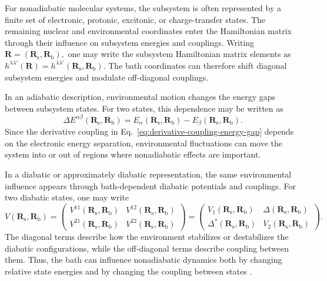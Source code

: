 \documentclass[
  11pt,
  letterpaper,
  onehalfspacing,
  normalmargins,
  equalmargins,
  oneside
]{ut-thesis}
\begin{document}
For nonadiabatic molecular systems, the subsystem is often represented by a
finite set of electronic, protonic, excitonic, or charge-transfer states. The
remaining nuclear and environmental coordinates enter the Hamiltonian matrix
through their influence on subsystem energies and couplings. Writing
$
\mathbf R
=
(\mathbf R_{\mathrm s},\mathbf R_{\mathrm b}),
$
one may write the subsystem Hamiltonian matrix elements as
$
h^{\lambda\lambda'}(\mathbf R)
=
h^{\lambda\lambda'}(\mathbf R_{\mathrm s},\mathbf R_{\mathrm b}) .
$
The bath coordinates can therefore shift diagonal subsystem energies and
modulate off-diagonal couplings.

In an adiabatic description, environmental motion changes the energy gaps
between subsystem states. For two states, this dependence may be written as
\begin{equation}
\Delta E^{\alpha\beta}
(\mathbf R_{\mathrm s},\mathbf R_{\mathrm b})
=
E_\alpha(\mathbf R_{\mathrm s},\mathbf R_{\mathrm b})
-
E_\beta(\mathbf R_{\mathrm s},\mathbf R_{\mathrm b}) .
\label{eq:bath-dependent-adiabatic-energy-gap}
\end{equation}
Since the derivative coupling in
Eq.~\eqref{eq:derivative-coupling-energy-gap} depends on the electronic energy
separation, environmental fluctuations can move the system into or out of
regions where nonadiabatic effects are important.

In a diabatic or approximately diabatic representation, the same environmental
influence appears through bath-dependent diabatic potentials and couplings. For
two diabatic states, one may write
\begin{equation}
V(\mathbf R_{\mathrm s},\mathbf R_{\mathrm b})
=
\begin{pmatrix}
V^{11}(\mathbf R_{\mathrm s},\mathbf R_{\mathrm b})
&
V^{12}(\mathbf R_{\mathrm s},\mathbf R_{\mathrm b})
\\
V^{21}(\mathbf R_{\mathrm s},\mathbf R_{\mathrm b})
&
V^{22}(\mathbf R_{\mathrm s},\mathbf R_{\mathrm b})
\end{pmatrix}
=
\begin{pmatrix}
V_1(\mathbf R_{\mathrm s},\mathbf R_{\mathrm b})
&
\Delta(\mathbf R_{\mathrm s},\mathbf R_{\mathrm b})
\\
\Delta^\ast(\mathbf R_{\mathrm s},\mathbf R_{\mathrm b})
&
V_2(\mathbf R_{\mathrm s},\mathbf R_{\mathrm b})
\end{pmatrix}.
\label{eq:bath-dependent-diabatic-potential-matrix}
\end{equation}
The diagonal terms describe how the environment stabilizes or destabilizes the
diabatic configurations, while the off-diagonal terms describe coupling
between them. Thus, the bath can influence nonadiabatic dynamics both by
changing relative state energies and by changing the coupling between states
\cite{Nitzan2006,MayKuhn2011}.
\end{document}
